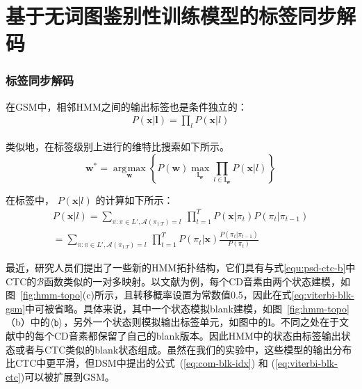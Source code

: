 \section{基于无词图鉴别性训练模型的标签同步解码}
\label{chap:lsd-lfmmi}

\subsubsection{标签同步解码}
\label{chap:lsd-lsd-hmm}

在GSM中，相邻HMM之间的输出标签也是条件独立的：
\begin{equation} \label{eq:viterbi-blk-hmm}
  \begin{split}
        P(\mathbf{x}|\mathbf{l}) 
        = \prod_{l} P(\mathbf{x}|l) \end{split}
       \end{equation}

类似地，在标签级别上进行的维特比搜索如下所示。
\begin{equation} \label{eq:gsm-dec-lsd}
   \mathbf{w}^* = \mathop{\arg\!\max}\limits_\mathbf{w} \left\{
        P(\mathbf{w})
        \mathop{\max}\limits_{\mathbf{l}_\mathbf{w}}  \prod_{l\in\mathbf{l}_\mathbf{w}} P(\mathbf{x}|l)\right\}
     \end{equation}

在标签中， $P(\mathbf{x}|l)$ 的计算如下所示：
\begin{equation} \label{eq:viterbi-blk-gsm}
  \begin{split}
        P(\mathbf{x}|l)
        = \sum_{\pi:\pi \in L',\mathcal{A}(\pi_{1\mathord{:}T})=l}
          \ \prod_{t=1}^{T} P(\mathbf{x}|\pi_t)P(\pi_t|\pi_{t-1})\\
= \sum_{\pi:\pi \in L',\mathcal{A}(\pi_{1\mathord{:}T})=l}
          \ \prod_{t=1}^{T} P(\pi_t|\mathbf{x})\frac{P(\pi_t|\pi_{t-1})}{P(\pi_t)}
        \end{split}
       \end{equation}  


最近，研究人员们提出了一些新的HMM拓扑结构\cite{povey2016purely,pundak2016lower}，它们具有与式\ref{equ:psd-ctc-b}中CTC的$\mathcal{B}$函数类似的一对多映射。以文献\cite{povey2016purely}为例，每个CD音素由两个状态建模，如图~\ref{fig:hmm-topo}(c)所示，且转移概率设置为常数值0.5，因此在式\ref{eq:viterbi-blk-gsm}中可被省略。具体来说，其中一个状态模拟blank建模，如图~\ref{fig:hmm-topo}（b）中的$\tt \langle b \rangle$，另外一个状态则模拟输出标签单元，如图中的$\mathbf{l}$。不同之处在于文献\cite{povey2016purely}中的每个CD音素都保留了自己的blank版本。因此HMM中的状态由标签输出状态或者与CTC类似的blank状态组成。虽然在我们的实验中，这些模型的输出分布比CTC中更平滑，但DSM中提出的公式~(\ref{eq:com-blk-idx}) 和 (\ref{eq:viterbi-blk-ctc})可以被扩展到GSM。


